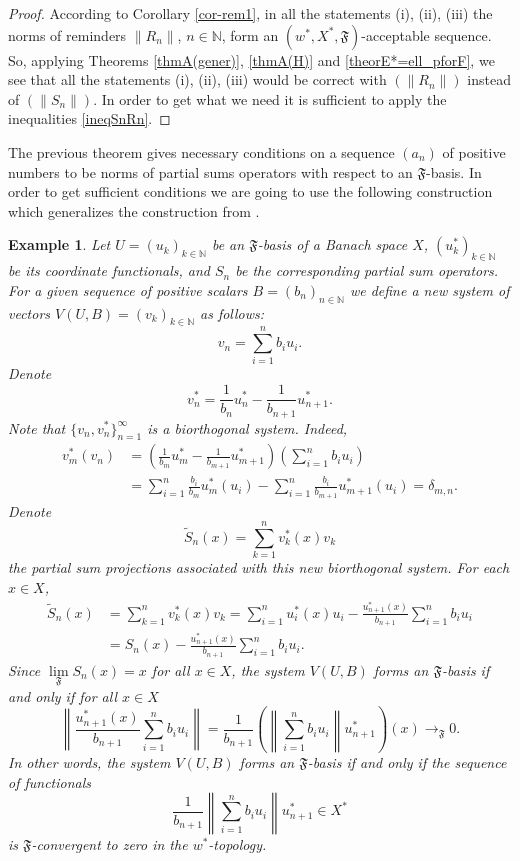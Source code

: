 \documentclass[11pt,twoside, reqno]{amsart}
\newcommand{\N}{{\mathbb N}}
\newcommand{\F}{\mathfrak{F}}
\newcommand{\flim}{\lim\limits_\F }
\theoremstyle{plain}
\newtheorem{example}[theorem]{Example}
\theoremstyle{remark}
\theoremstyle{definition}
\numberwithin{equation}{section}
\begin{document}
\begin{proof}
According to Corollary \ref{cor-rem1},  in all the statements (i), (ii), (iii) the norms of reminders $\|R_n\|$, $n \in \N$, form an $(w^*, X^*, \mathfrak F)$-acceptable sequence. So, applying Theorems \ref{thmA(gener)}, \ref{thmA(H)} and \ref{theorE*=ell_pforF}, we see that all the statements (i), (ii), (iii) would be correct with  $\left(\|R_n\|\right)$ instead of $\left(\|S_n\|\right)$. In order to get what we need it is sufficient to apply the inequalities \eqref{ineqSnRn}.
\end{proof}

The previous theorem gives necessary conditions on a sequence $(a_n)$ of positive numbers to be norms of partial sums operators with respect to an $\F$-basis. In order to get sufficient conditions we are going to use the following construction which generalizes the construction from \cite[Theorem 1]{Kad-bib-ip}.


\begin{example} \label{example1}
Let $U=(u_k)_{k \in \N}$ be an $\F$-basis of a Banach space $X$, $(u^*_k)_{k \in \N}$ be its coordinate functionals, and $S_n$ be the corresponding partial sum operators. For a given sequence of positive scalars $B=(b_n)_{n \in \N}$ we define a new system of vectors $V(U, B) = (v_k)_{k \in \N}$ as follows:
$$
v_n=\sum\limits_{i=1}^n b_i u_i.
$$
Denote 
$$
v_n^*=\frac{1}{b_n}u^*_n-\frac{1}{b_{n+1}}u^*_{n+1}.
$$
Note that $\{v_n,v_n^*\}_{n=1}^{\infty}$ is a biorthogonal system. Indeed, 
\begin{align*}
    v_m^*(v_n)&=\left(\frac{1}{b_m}u^*_m-\frac{1}{b_{m+1}}u^*_{m+1}\right)\left( \sum_{i=1}^n b_i u_i\right)\\ 
    &=\sum_{i=1}^n\frac{b_i}{b_m}u_m^*(u_i)-\sum_{i=1}^n\frac{b_i}{b_{m+1}}u_{m+1}^*(u_i)=\delta_{m,n}.
\end{align*}
Denote 
$$
\tilde S_n(x)=\sum\limits_{k=1}^n v_k^*(x)v_k
$$
the partial sum projections associated with this new biorthogonal system.
For each $x \in X$,   
\begin{align} \label{eq-ex-newsums}
\tilde S_n(x)&=\sum\limits_{k=1}^n v_k^*(x)v_k =\sum\limits_{i=1}^n u_i^*(x) u_i - \frac{u_{n+1}^*(x)}{b_{n+1}}\sum\limits_{i=1}^n b_iu_i \nonumber \\ &= S_n(x) - \frac{u_{n+1}^*(x)}{b_{n+1}}\sum\limits_{i=1}^n b_iu_i.
\end{align}
Since $\flim S_n(x) = x$ for all $x \in X$, the system $V(U, B)$ forms an $\F$-basis if and only if for all $x \in X$
$$
\left\|\frac{u_{n+1}^*(x)}{b_{n+1}}\sum\limits_{i=1}^n b_iu_i\right\| = \frac{1}{b_{n+1}} \left(\left\|\sum\limits_{i=1}^n b_i u_i\right\| u_{n+1}^*\right)(x)  \to_\mathfrak{F} 0.
$$
In other words, the system $V(U, B)$ forms an $\F$-basis if and only if the sequence of functionals
$$
\frac{1}{b_{n+1}} \left\|\sum\limits_{i=1}^n b_i u_i\right\| u_{n+1}^* \in X^*
$$
is $\F$-convergent to zero in the $w^*$-topology.
\end{example}
\end{document}
